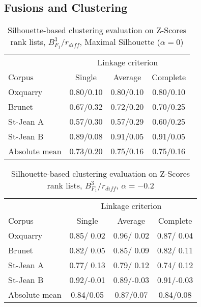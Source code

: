 \subsection{Fusions and Clustering}

\begin{table}[H]
  \centering
  \caption{Silhouette-based clustering evaluation on Z-Scores rank lists, $B^3_{F_1}$/$r_{diff}$, Maximal Silhouette ($\alpha = 0$)}
  \label{tab:silhouette-based_clustering_zscore}

  \begin{tabular}{l c c c}
    \toprule
           & \multicolumn{3}{c}{Linkage criterion} \\
    Corpus    & Single     & Average   & Complete \\
    \midrule
    Oxquarry  & 0.80/0.10 & 0.80/0.10 & 0.80/0.10 \\
    Brunet    & 0.67/0.32 & 0.72/0.20 & 0.70/0.25 \\
    St-Jean A & 0.57/0.30 & 0.57/0.29 & 0.60/0.25 \\
    St-Jean B & 0.89/0.08 & 0.91/0.05 & 0.91/0.05 \\
    \midrule
    Absolute mean & 0.73/0.20 & 0.75/0.16 & 0.75/0.16 \\
    \bottomrule
  \end{tabular}
\end{table}

\begin{table}[H]
  \centering
  \caption{Silhouette-based clustering evaluation on Z-Scores rank lists, $B^3_{F_1}$/$r_{diff}$, $\alpha = -0.2$}
  \label{tab:silhouette-based_clustering_zscore_alpha}

  \begin{tabular}{l c c c}
    \toprule
           & \multicolumn{3}{c}{Linkage criterion} \\
    Corpus    & Single     & Average   & Complete \\
    \midrule
    Oxquarry  & 0.85/ 0.02 & 0.96/ 0.02 & 0.87/ 0.04 \\
    Brunet    & 0.82/ 0.05 & 0.85/ 0.09 & 0.82/ 0.11 \\
    St-Jean A & 0.77/ 0.13 & 0.79/ 0.12 & 0.74/ 0.12 \\
    St-Jean B & 0.92/-0.01 & 0.89/-0.03 & 0.91/-0.03 \\
    \midrule
    Absolute mean & 0.84/0.05 & 0.87/0.07 & 0.84/0.08 \\
    \bottomrule
  \end{tabular}
\end{table}


